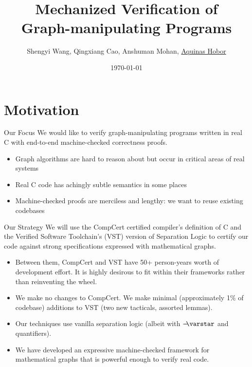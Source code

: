 \documentclass[professionalfonts, xcolor=table]{beamer}
\title[Mechanized Verification]{Mechanized Verification of \\
  Graph-manipulating Programs}
\author[Wang, Cao, Mohan, Hobor]{Shengyi Wang, Qingxiang Cao, Anshuman Mohan, \underline{Aquinas Hobor}}
\institute[NUS]{National University of Singapore}
\date{\today}
\newcommand{\scon}{\mathbin{\varstar}}
\newcommand{\wand}{%
 \mathrel{\mbox{$\hspace*{-0.03em}\mathord{-}\hspace*{-0.66em}
  \mathord{-}\hspace*{-0.36em}\mathord{\scon}$\hspace*{-0.005em}}}}
\begin{document}
\begin{frame}
  \titlepage
\end{frame}

\newcommand\hide[1]{}

\section{Motivation}


\begin{frame}{Our Focus}
We would like to verify \alert{graph-manipulating} programs written in \alert{real C}
with end-to-end \alert{machine-checked} correctness proofs.
\begin{itemize}
\item Graph algorithms are hard to reason about but occur in critical areas of real systems
\item Real C code has achingly subtle semantics in some places
\item Machine-checked proofs are merciless and lengthy: we want to reuse existing codebases
\end{itemize}
\end{frame}

\begin{frame}{Our Strategy}
We will use the \alert{CompCert} certified compiler's definition of C and the \alert{Verified Software Toolchain}'s (VST) version of \alert{Separation Logic} to certify our code against strong specifications expressed with \alert{mathematical graphs}.
\begin{itemize}
\item Between them, CompCert and VST have 50+ person-years worth of development effort.  \alert{It is highly desirous to fit within their frameworks rather than reinventing the wheel.}
\item We make no changes to CompCert.  We make minimal (\alert{approximately 1\% of codebase}) additions to VST (two new tacticals, assorted lemmas).
\item Our techniques use vanilla separation logic (albeit with $\wand$ and quantifiers).
\item We have developed an expressive machine-checked framework for mathematical graphs that is \alert{powerful enough to verify real code}.
\end{itemize}
\end{frame}
\end{document}
